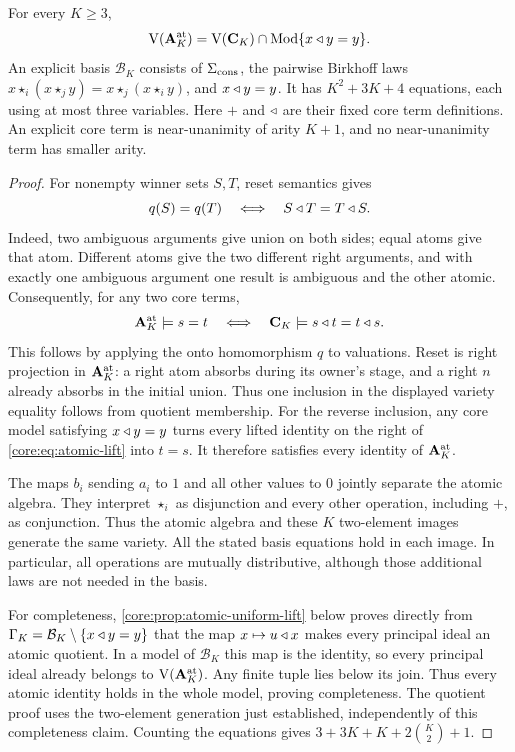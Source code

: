 \begin{theorem}\label{core:thm:atomic-basis}
For every $K\geq3$,
\[
 \operatorname V(\mathbf A_K^{\rm at})
 =\operatorname V(\mathbf C_K)\cap
   \operatorname{Mod}\{x\mathbin{\triangleleft} y=y\}.
\]
An explicit basis $\mathcal B_K$ consists of $\Sigma_{\rm cons}$,
the pairwise Birkhoff laws
$x\star_i(x\star_j y)=x\star_j(x\star_i y)$, and $x\mathbin{\triangleleft} y=y$.
It has $K^2+3K+4$ equations, each using at most three variables.
Here $+$ and $\mathbin{\triangleleft}$ are their fixed core term definitions.
An explicit core term is near-unanimity of arity $K+1$,
and no near-unanimity term has smaller arity.
\end{theorem}
\begin{proof}
For nonempty winner sets $S,T$, reset semantics gives
\begin{equation}\label{core:eq:atomic-kernel}
 q(S)=q(T)\quad\Longleftrightarrow\quad S\mathbin{\triangleleft} T=T\mathbin{\triangleleft} S.
\end{equation}
Indeed, two ambiguous arguments give union on both sides; equal
atoms give that atom. Different atoms give the two different right
arguments, and with exactly one ambiguous argument one result is
ambiguous and the other atomic. Consequently, for any two core terms,
\begin{equation}\label{core:eq:atomic-lift}
 \mathbf A_K^{\rm at}\models s=t
 \quad\Longleftrightarrow\quad
 \mathbf C_K\models s\mathbin{\triangleleft} t=t\mathbin{\triangleleft} s.
\end{equation}
This follows by applying the onto homomorphism $q$ to valuations.
Reset is right projection in $\mathbf A_K^{\rm at}$: a right atom
absorbs during its owner's stage, and a right $n$ already absorbs
in the initial union. Thus one inclusion in the displayed variety
equality follows from quotient membership. For the reverse inclusion,
any core model satisfying $x\mathbin{\triangleleft} y=y$ turns every lifted identity
on the right of \eqref{core:eq:atomic-lift} into $t=s$. It therefore
satisfies every identity of $\mathbf A_K^{\rm at}$.

The maps $b_i$ sending $a_i$ to $1$ and all other
values to $0$ jointly separate the atomic algebra. They interpret
$\star_i$ as disjunction and every other operation, including $+$,
as conjunction. Thus the atomic algebra and these $K$ two-element
images generate the same variety. All the stated basis equations
hold in each image. In particular, all operations are mutually
distributive, although those additional laws are not needed in the basis.

For completeness, \cref{core:prop:atomic-uniform-lift} below proves
directly from $\Gamma_K=\mathcal B_K\setminus\{x\mathbin{\triangleleft} y=y\}$ that
the map $x\mapsto u\mathbin{\triangleleft} x$ makes every principal ideal an atomic
quotient. In a model of $\mathcal B_K$ this map is the identity,
so every principal ideal already belongs to
$\operatorname V(\mathbf A_K^{\rm at})$. Any finite tuple lies
below its join. Thus every atomic identity holds in the whole model,
proving completeness. The quotient proof uses the two-element
generation just established, independently of this completeness claim.
Counting the equations gives $3+3K+K+2\binom K2+1$.


\end{proof}
